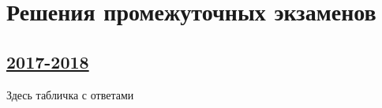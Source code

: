 \thispagestyle{empty}
\section{Решения промежуточных экзаменов}


\subsection[2017-2018]{\hyperref[sec:midterm_exam_2017_2018]{2017-2018}}
\label{sec:sol_midterm_exam_2017_2018}

Здесь табличка с ответами
